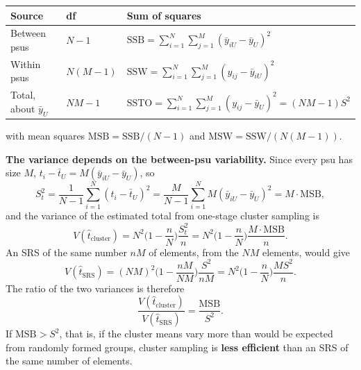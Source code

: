 \documentclass[
  letterpaper,
  DIV=11,
  numbers=noendperiod]{scrreprt}
\newcounter{none} %
\renewcommand{\[}{\begin{equation}}
\renewcommand{\]}{\end{equation}}
\begin{document}
{\def\LTcaptype{none} %
\begin{longtable}[]{@{}
  >{\raggedright\arraybackslash}p{}
  >{\centering\arraybackslash}p{}
  >{\raggedright\arraybackslash}p{}@{}}
\toprule\noalign{}
\begin{minipage}[b]{\linewidth}\raggedright
Source
\end{minipage} & \begin{minipage}[b]{\linewidth}\centering
df
\end{minipage} & \begin{minipage}[b]{\linewidth}\raggedright
Sum of squares
\end{minipage} \\
\midrule\noalign{}
\endhead
\bottomrule\noalign{}
\endlastfoot
Between psus & \(N-1\) &
\(\text{SSB} = \sum_{i=1}^N\sum_{j=1}^M (\bar y_{iU}-\bar y_U)^2\) \\
Within psus & \(N(M-1)\) &
\(\text{SSW} = \sum_{i=1}^N\sum_{j=1}^M (y_{ij}-\bar y_{iU})^2\) \\
Total, about \(\bar y_U\) & \(NM-1\) &
\(\text{SSTO} = \sum_{i=1}^N\sum_{j=1}^M (y_{ij}-\bar y_U)^2 = (NM-1)S^2\) \\
\end{longtable}
}

with mean squares \(\text{MSB} = \text{SSB}/(N-1)\) and
\(\text{MSW} = \text{SSW}/(N(M-1))\).

\textbf{The variance depends on the between-psu variability.} Since
every psu has size \(M\),
\(t_i - \bar t_U = M(\bar y_{iU} - \bar y_U)\), so \[
S_t^2 = \frac{1}{N-1}\sum_{i=1}^N (t_i-\bar t_U)^2 = \frac{M}{N-1}\sum_{i=1}^N M(\bar y_{iU}-\bar y_U)^2 = M\cdot\text{MSB},
\] and the variance of the estimated total from one-stage cluster
sampling is \[
V(\hat t_{\text{cluster}}) = N^2\Big(1-\frac nN\Big)\frac{S_t^2}{n} = N^2\Big(1-\frac nN\Big)\frac{M\cdot\text{MSB}}{n}.
\] An SRS of the same number \(nM\) of elements, from the \(NM\)
elements, would give \[
V(\hat t_{\text{SRS}}) = (NM)^2\Big(1-\frac{nM}{NM}\Big)\frac{S^2}{nM} = N^2\Big(1-\frac nN\Big)\frac{M S^2}{n}.
\] The ratio of the two variances is therefore \[
\frac{V(\hat t_{\text{cluster}})}{V(\hat t_{\text{SRS}})} = \frac{\text{MSB}}{S^2}.
\] If \(\text{MSB} > S^2\), that is, if the cluster means vary more than
would be expected from randomly formed groups, cluster sampling is
\textbf{less efficient} than an SRS of the same number of elements.
\end{document}
